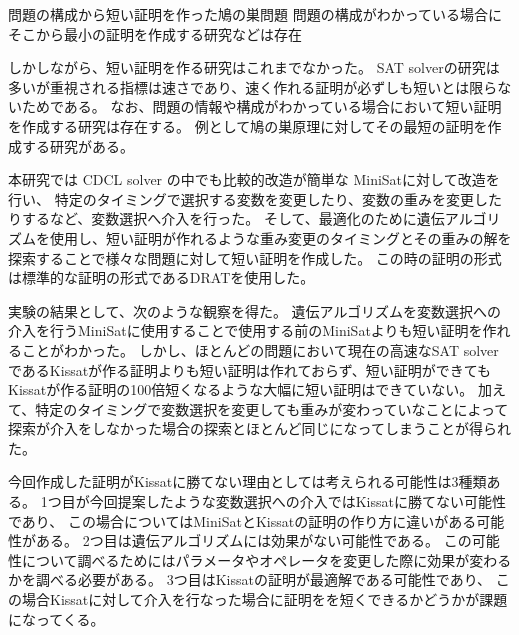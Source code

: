 問題の構成から短い証明を作った鳩の巣問題
問題の構成がわかっている場合にそこから最小の証明を作成する研究などは存在

しかしながら、短い証明を作る研究はこれまでなかった。
SAT solverの研究は多いが重視される指標は速さであり、速く作れる証明が必ずしも短いとは限らないためである。
なお、問題の情報や構成がわかっている場合において短い証明を作成する研究は存在する。
例として鳩の巣原理に対してその最短の証明を作成する研究がある。

本研究では CDCL solver の中でも比較的改造が簡単な MiniSatに対して改造を行い、
特定のタイミングで選択する変数を変更したり、変数の重みを変更したりするなど、変数選択へ介入を行った。
そして、最適化のために遺伝アルゴリズムを使用し、短い証明が作れるような重み変更のタイミングとその重みの解を探索することで様々な問題に対して短い証明を作成した。
この時の証明の形式は標準的な証明の形式であるDRATを使用した。

実験の結果として、次のような観察を得た。
遺伝アルゴリズムを変数選択への介入を行うMiniSatに使用することで使用する前のMiniSatよりも短い証明を作れることがわかった。
しかし、ほとんどの問題において現在の高速なSAT solverであるKissatが作る証明よりも短い証明は作れておらず、短い証明ができてもKissatが作る証明の100倍短くなるような大幅に短い証明はできていない。
加えて、特定のタイミングで変数選択を変更しても重みが変わっていなことによって探索が介入をしなかった場合の探索とほとんど同じになってしまうことが得られた。

今回作成した証明がKissatに勝てない理由としては考えられる可能性は3種類ある。
1つ目が今回提案したような変数選択への介入ではKissatに勝てない可能性であり、
この場合についてはMiniSatとKissatの証明の作り方に違いがある可能性がある。
2つ目は遺伝アルゴリズムには効果がない可能性である。
この可能性について調べるためにはパラメータやオペレータを変更した際に効果が変わるかを調べる必要がある。
3つ目はKissatの証明が最適解である可能性であり、
この場合Kissatに対して介入を行なった場合に証明をを短くできるかどうかが課題になってくる。